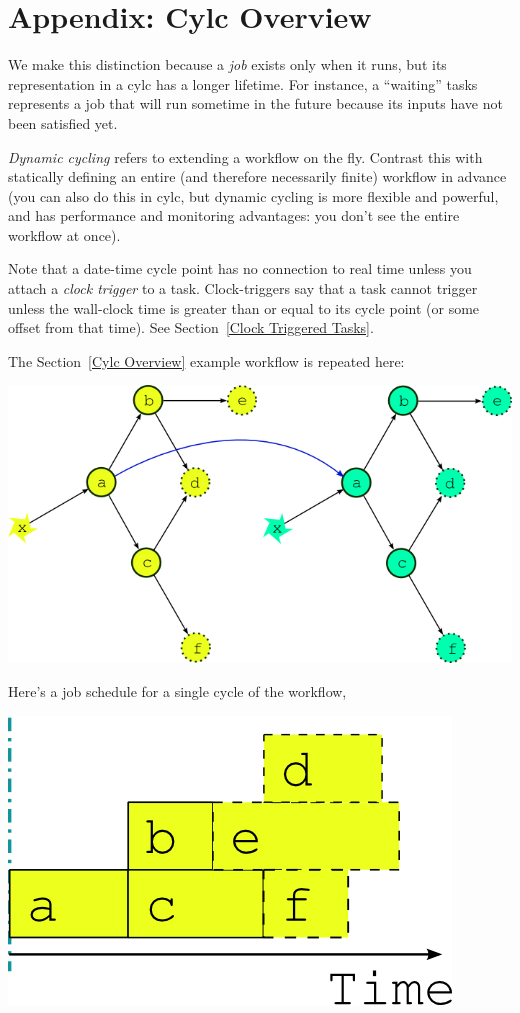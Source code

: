 \section{Appendix: Cylc Overview}
\label{Appendix Cylc Overview}


 We make this distinction because a {\em job}
exists only when it runs, but its representation in a cylc has a longer
lifetime.  For instance, a ``waiting'' tasks represents a job that will run
sometime in the future because its inputs have not been satisfied yet.

  {\em Dynamic cycling} refers to 
extending a workflow on the fly. Contrast this with statically defining
an entire (and therefore necessarily finite) workflow in advance (you can also
do this in cylc, but dynamic cycling is more flexible and powerful, and has
performance and monitoring advantages: you don't see the entire workflow at
once).

  Note that a date-time cycle point has no connection to real
time unless you attach a {\em clock trigger} to a task.  Clock-triggers
say that a task cannot trigger unless the wall-clock time is greater than
or equal to its cycle point (or some offset from that time).  See
Section~\ref{Clock Triggered Tasks}.

The Section~\ref{Cylc Overview} example workflow is repeated here:
\begin{center}
    \includegraphics[width=0.4\columnwidth]{resources/tex/dep-two-cycles-linked}
\end{center}

Here's a job schedule for a single cycle of the workflow,
\begin{center}
    \includegraphics[width=0.17\columnwidth]{resources/tex/timeline-zero.png}
\end{center}

